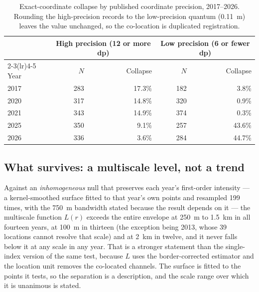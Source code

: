 \documentclass[fleqn,10pt,lineno]{wlpeerj}
\newcommand{\dropNt}{39}
\begin{document}
\begin{table}[htbp]
\centering
\caption{Exact-coordinate collapse by published coordinate precision, 2017--2026. Rounding the high-precision records to the low-precision quantum (\SI{0.11}{\meter}) leaves the value unchanged, so the co-location is duplicated registration.}
\label{tab:precision}
\footnotesize
\setlength{\tabcolsep}{5pt}
\begin{tabular}{lrrrr}
\toprule
 & \multicolumn{2}{c}{High precision (12 or more dp)} & \multicolumn{2}{c}{Low precision (6 or fewer dp)} \\
\cmidrule(lr){2-3}\cmidrule(lr){4-5}
Year & $N$ & Collapse & $N$ & Collapse \\
\midrule
2017 & 283 & 17.3\% & 182 & \phantom{0}3.8\% \\
2020 & 317 & 14.8\% & 320 & \phantom{0}0.9\% \\
2021 & 343 & 14.9\% & 374 & \phantom{0}0.3\% \\
2025 & 350 & \phantom{0}9.1\% & 257 & 43.6\% \\
2026 & 336 & \phantom{0}3.6\% & 284 & 44.7\% \\
\bottomrule
\end{tabular}
\end{table}

\subsection*{What survives: a multiscale level, not a trend}
\label{sec:results-mech}

Against an \emph{inhomogeneous} null that preserves each year's first-order intensity --- a
kernel-smoothed surface fitted to that year's own points and resampled \num{199} times, with the
\SI{750}{\meter} bandwidth stated because the result depends on it --- the multiscale function
$L(r)$ exceeds the entire envelope at \SI{250}{\meter} to \SI{1.5}{\kilo\meter} in all fourteen
years, at \SI{100}{\meter} in thirteen (the exception being 2013, whose \dropNt{} locations
cannot resolve that scale) and at \SI{2}{\kilo\meter} in twelve, and it never falls below it at
any scale in any year. That is a stronger statement than the single-index version of the same
test, because $L$ uses the border-corrected estimator and the location unit removes the co-located channels.
The surface is fitted to the points it tests, so the separation is a description, and the
scale range over which it is unanimous is stated.
\end{document}
